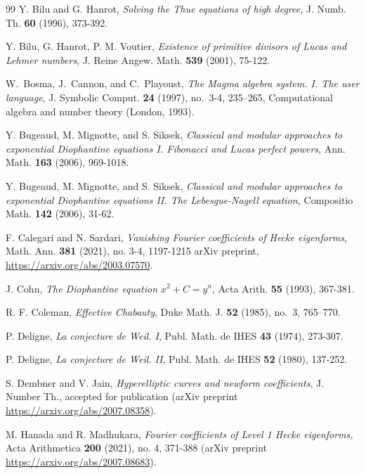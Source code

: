 \documentclass[12pt]{amsart}
\newcommand{\?}{\color{red}?}
\numberwithin{equation}{section}
\begin{document}
\begin{thebibliography}{99}
 Y. Bilu and G. Hanrot, \emph{Solving the Thue equations of high degree}, J. Numb. Th.
\textbf{60} (1996), 373-392.

 Y. Bilu, G. Hanrot, P. M. Voutier, \emph{Existence of primitive divisors of Lucas and Lehmer numbers},
J. Reine Angew. Math.  \textbf{539} (2001), 75-122.

W.~Bosma, J.~Cannon, and C.~Playoust, \emph{The {M}agma algebra system. {I}.
  {T}he user language}, J. Symbolic Comput. \textbf{24} (1997), no.~3-4,
  235--265, Computational algebra and number theory (London, 1993). 

 Y. Bugeaud, M. Mignotte, and S. Siksek, \emph{Classical and modular approaches to exponential
Diophantine equations I. Fibonacci and Lucas perfect powers}, Ann. Math. \textbf{163} (2006), 969-1018.

 Y. Bugeaud, M. Mignotte, and S. Siksek, \emph{Classical and modular approaches to exponential Diophantine equations II. The Lebesgue-Nagell equation,} Compositio Math.
\textbf{142} (2006), 31-62.

 F. Calegari and N. Sardari, \emph{Vanishing Fourier coefficients of Hecke eigenforms},
Math. Ann. \textbf{381} (2021), no. 3-4, 1197-1215
arXiv preprint, \url{https://arxiv.org/abs/2003.07570}.

 J. Cohn, \emph{The Diophantine equation $x^2+C=y^n$}, Acta Arith.
\textbf{55} (1993), 367-381.


R. F. Coleman, \emph{Effective {C}habauty}, Duke Math. J. \textbf{52} (1985), no.~3,
  765--770.


 P. Deligne, \emph{La conjecture de Weil. I}, Publ. Math. de IHES \textbf{43} (1974), 273-307.

 P. Deligne, \emph{La conjecture de Weil. II}, Publ. Math. de IHES \textbf{52} (1980), 137-252.

 S. Dembner and V. Jain, \emph{Hyperelliptic curves and newform coefficients}, J. Number Th., accepted for publication (arXiv preprint  \url{https://arxiv.org/abs/2007.08358}).


 M. Hanada and R. Madhukara, \emph{Fourier coefficients of Level 1 Hecke eigenforms,} Acta Arithmetica \textbf{200} (2021), no. 4, 371-388  (arXiv preprint  \url{https://arxiv.org/abs/2007.08683}).




\end{thebibliography}
\end{document}
